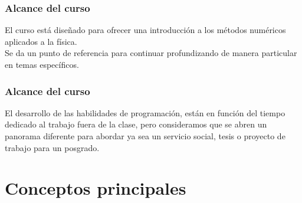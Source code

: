 \begin{frame}[fragile]
\begin{figure}
\centering

\end{figure}
\end{frame}
\begin{frame}
\frametitle{Alcance del curso}
El curso está diseñado para ofrecer una introducción a los métodos numéricos aplicados a la física.
\\
\medskip
Se da un punto de referencia para continuar profundizando de manera particular en temas específicos. 
\end{frame}
\begin{frame}
\frametitle{Alcance del curso}
El desarrollo de las habilidades de programación, están en función del tiempo dedicado al trabajo fuera de la clase, pero consideramos que se abren un panorama diferente para abordar ya sea un servicio social, tesis o proyecto de trabajo para un posgrado.
\end{frame}

\section{Conceptos principales}
